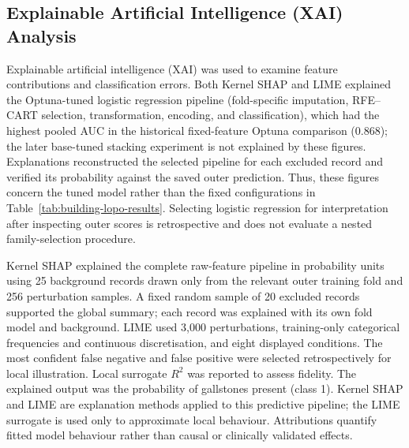 \subsection{Explainable Artificial Intelligence (XAI) Analysis}
Explainable artificial intelligence (XAI) was used to examine feature contributions and classification errors. Both Kernel SHAP and LIME explained the Optuna-tuned logistic regression pipeline (fold-specific imputation, RFE--CART selection, transformation, encoding, and classification), which had the highest pooled AUC in the historical fixed-feature Optuna comparison (0.868); the later base-tuned stacking experiment is not explained by these figures. Explanations reconstructed the selected pipeline for each excluded record and verified its probability against the saved outer prediction. Thus, these figures concern the tuned model rather than the fixed configurations in Table~\ref{tab:building-lopo-results}. Selecting logistic regression for interpretation after inspecting outer scores is retrospective and does not evaluate a nested family-selection procedure.

Kernel SHAP \parencite{lundberg2017shap} explained the complete raw-feature pipeline in probability units using 25 background records drawn only from the relevant outer training fold and 256 perturbation samples. A fixed random sample of 20 excluded records supported the global summary; each record was explained with its own fold model and background. LIME \parencite{ribeiro2016lime} used 3,000 perturbations, training-only categorical frequencies and continuous discretisation, and eight displayed conditions. The most confident false negative and false positive were selected retrospectively for local illustration. Local surrogate $R^2$ was reported to assess fidelity. The explained output was the probability of gallstones present (class 1). Kernel SHAP and LIME are explanation methods applied to this predictive pipeline; the LIME surrogate is used only to approximate local behaviour. Attributions quantify fitted model behaviour rather than causal or clinically validated effects.
